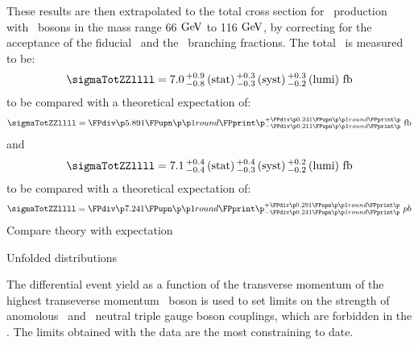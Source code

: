 These results are then extrapolated to the total cross section for \ZZ\
production with \Z\ bosons in the mass range 66$\GeV$ to 116$\GeV$, by
correcting for the acceptance of the fiducial \phasespace\ and the \Zll\
branching fractions. The total \cx\ is measured to be:
\begin{equation}
\sigmaTotZZllll = \ZZSevenTeVTotalCrossSection
\end{equation}
to be compared with a theoretical expectation of:
\begin{equation}
\sigmaTotZZllll = \ZZSevenTeVTheoryTotalCrossSection
\end{equation}
and
\begin{equation}
\sigmaTotZZllll = \ZZEightTeVTotalCrossSection
\end{equation}
to be compared with a theoretical expectation of:
\begin{equation}
\sigmaTotZZllll = \ZZEightTeVTheoryTotalCrossSection
\end{equation}
Compare theory with expectation

Unfolded distributions

The differential event yield as a function of the transverse momentum of the
highest transeverse momentum \Z\ boson is used to set limits on the strength of
anomolous \ZZZ\ and \ZZg\ neutral triple gauge boson couplings, which are
forbidden in the \sm. 
The limits obtained with the \sqrtseq{8} data are the most constraining to date.
